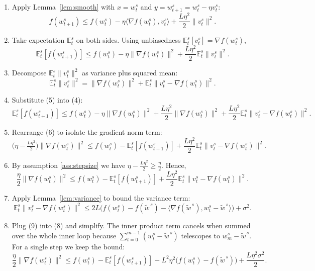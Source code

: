 \documentclass{article}
\begin{document}
\begin{enumerate}[label=[Step \arabic*], leftmargin=*]
\item Apply Lemma~\ref{lem:smooth} with $x=w_{t}^{s}$ and $y=w_{t+1}^{s}=w_{t}^{s}-\eta v_{t}^{s}$:
\[
f(w_{t+1}^{s})\le f(w_{t}^{s})-\eta\langle\nabla f(w_{t}^{s}),v_{t}^{s}\rangle+\frac{L\eta^{2}}{2}\|v_{t}^{s}\|^{2}.
\tag{3}
\]

\item Take expectation $\mathbb{E}_{t}^{s}$ on both sides.  Using unbiasedness $\mathbb{E}_{t}^{s}[v_{t}^{s}]=\nabla f(w_{t}^{s})$,
\[
\mathbb{E}_{t}^{s}[f(w_{t+1}^{s})]\le
f(w_{t}^{s})-\eta\|\nabla f(w_{t}^{s})\|^{2}
+\frac{L\eta^{2}}{2}\mathbb{E}_{t}^{s}\|v_{t}^{s}\|^{2}.
\tag{4}
\]

\item Decompose $\mathbb{E}_{t}^{s}\|v_{t}^{s}\|^{2}$ as variance plus squared mean:
\[
\mathbb{E}_{t}^{s}\|v_{t}^{s}\|^{2}
= \|\nabla f(w_{t}^{s})\|^{2}
   +\mathbb{E}_{t}^{s}\|v_{t}^{s}-\nabla f(w_{t}^{s})\|^{2}.
\tag{5}
\]

\item Substitute (5) into (4):
\[
\mathbb{E}_{t}^{s}[f(w_{t+1}^{s})]\le
f(w_{t}^{s})-\eta\|\nabla f(w_{t}^{s})\|^{2}
+\frac{L\eta^{2}}{2}\|\nabla f(w_{t}^{s})\|^{2}
+\frac{L\eta^{2}}{2}\mathbb{E}_{t}^{s}\|v_{t}^{s}-\nabla f(w_{t}^{s})\|^{2}.
\tag{6}
\]

\item Rearrange (6) to isolate the gradient norm term:
\[
\bigl(\eta-\tfrac{L\eta^{2}}{2}\bigr)\|\nabla f(w_{t}^{s})\|^{2}
\le f(w_{t}^{s})-\mathbb{E}_{t}^{s}[f(w_{t+1}^{s})]
+\frac{L\eta^{2}}{2}\mathbb{E}_{t}^{s}\|v_{t}^{s}-\nabla f(w_{t}^{s})\|^{2}.
\tag{7}
\]

\item By assumption \ref{ass:stepsize} we have $\eta-\frac{L\eta^{2}}{2}\ge\frac{\eta}{2}$.  Hence,
\[
\frac{\eta}{2}\|\nabla f(w_{t}^{s})\|^{2}
\le f(w_{t}^{s})-\mathbb{E}_{t}^{s}[f(w_{t+1}^{s})]
+\frac{L\eta^{2}}{2}\mathbb{E}_{t}^{s}\|v_{t}^{s}-\nabla f(w_{t}^{s})\|^{2}.
\tag{8}
\]

\item Apply Lemma~\ref{lem:variance} to bound the variance term:
\[
\mathbb{E}_{t}^{s}\|v_{t}^{s}-\nabla f(w_{t}^{s})\|^{2}
\le
2L\bigl(f(w_{t}^{s})-f(\tilde w^{\,s})
      -\langle\nabla f(\tilde w^{\,s}),w_{t}^{s}-\tilde w^{\,s}\rangle\bigr)
+\sigma^{2}.
\tag{9}
\]

\item Plug (9) into (8) and simplify.  The inner product term cancels when summed over the whole inner loop because $\sum_{t=0}^{m-1}(w_{t}^{s}-\tilde w^{\,s})$ telescopes to $w_{m}^{s}-\tilde w^{\,s}$.  For a single step we keep the bound:
\[
\frac{\eta}{2}\|\nabla f(w_{t}^{s})\|^{2}
\le
f(w_{t}^{s})-\mathbb{E}_{t}^{s}[f(w_{t+1}^{s})]
+L^{2}\eta^{2}\bigl(f(w_{t}^{s})-f(\tilde w^{\,s})\bigr)
+\frac{L\eta^{2}\sigma^{2}}{2}.
\tag{10}
\]


\end{enumerate}
\end{document}
